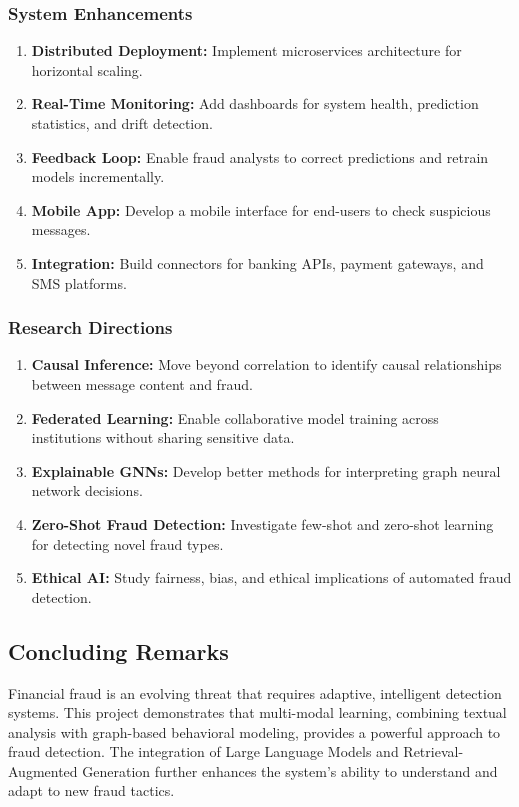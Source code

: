 \subsubsection{System Enhancements}

\begin{enumerate}
    \item \textbf{Distributed Deployment:} Implement microservices architecture for horizontal scaling.
    \item \textbf{Real-Time Monitoring:} Add dashboards for system health, prediction statistics, and drift detection.
    \item \textbf{Feedback Loop:} Enable fraud analysts to correct predictions and retrain models incrementally.
    \item \textbf{Mobile App:} Develop a mobile interface for end-users to check suspicious messages.
    \item \textbf{Integration:} Build connectors for banking APIs, payment gateways, and SMS platforms.
\end{enumerate}

\subsubsection{Research Directions}

\begin{enumerate}
    \item \textbf{Causal Inference:} Move beyond correlation to identify causal relationships between message content and fraud.
    \item \textbf{Federated Learning:} Enable collaborative model training across institutions without sharing sensitive data.
    \item \textbf{Explainable GNNs:} Develop better methods for interpreting graph neural network decisions.
    \item \textbf{Zero-Shot Fraud Detection:} Investigate few-shot and zero-shot learning for detecting novel fraud types.
    \item \textbf{Ethical AI:} Study fairness, bias, and ethical implications of automated fraud detection.
\end{enumerate}

\subsection{Concluding Remarks}

Financial fraud is an evolving threat that requires adaptive, intelligent detection systems. This project demonstrates that multi-modal learning, combining textual analysis with graph-based behavioral modeling, provides a powerful approach to fraud detection. The integration of Large Language Models and Retrieval-Augmented Generation further enhances the system's ability to understand and adapt to new fraud tactics.


